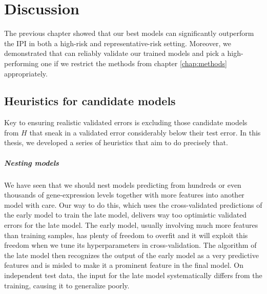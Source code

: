 \chapter{Discussion} \label{chap:discussion}

The previous chapter showed that our best models can significantly outperform the IPI in both 
a high-risk and representative-risk setting. Moreover, we demonstrated that can reliably validate 
our trained models and pick a high-performing one if we restrict the methods from chapter 
\ref{chap:methods} appropriately.

\section{Heuristics for candidate models}

Key to ensuring realistic validated errors is excluding those candidate models from $H$ that sneak 
in a validated error considerably below their test error. In this thesis, we developed a series 
of heuristics that aim to do precisely that.

\paragraph{Nesting models}
We have seen that we should nest models predicting from hundreds or even thousands of 
gene-expression levels together with more features into another model with care. Our way to do 
this, which uses the cross-validated predictions of the early model to train the late model, 
delivers way too optimistic validated errors for the late model. The early model, usually involving 
much more features than training samples, has plenty of freedom to overfit and it will exploit this 
freedom when we tune its hyperparameters in cross-validation. The algorithm of the late model then 
recognizes the output of the early model as a very predictive features and is misled to make it 
a prominent feature in the final model. On independent test data, the input for the late model 
systematically differs from the training, causing it to generalize poorly.

